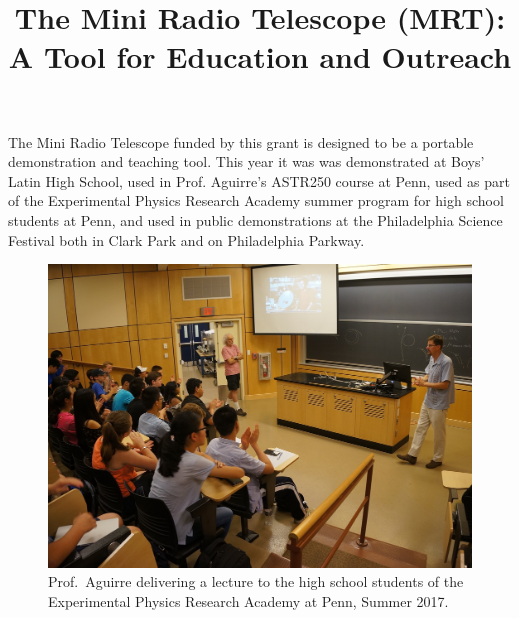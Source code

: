 \documentclass[11pt,letterpaper]{spie}
\title{The Mini Radio Telescope (MRT):\\
A Tool for Education and Outreach}
\begin{document}
\maketitle

The Mini Radio Telescope funded by this grant is designed to be a portable demonstration and teaching tool.  This year it was was demonstrated at Boys' Latin High School, used in Prof. Aguirre's ASTR250 course at Penn, used as part of the Experimental Physics Research Academy summer program for high school students at Penn, and used in public demonstrations at the Philadelphia Science Festival both in Clark Park and on Philadelphia Parkway.

\begin{figure}[h]
\centering
\includegraphics[width=6.5in]{EPRA_Lecture.jpg}
\vspace{5pt}
\caption{Prof.~Aguirre delivering a lecture to the high school students of the Experimental Physics Research Academy at Penn, Summer 2017.  
}
\label{fig:Devices}
\end{figure}
\end{document}
